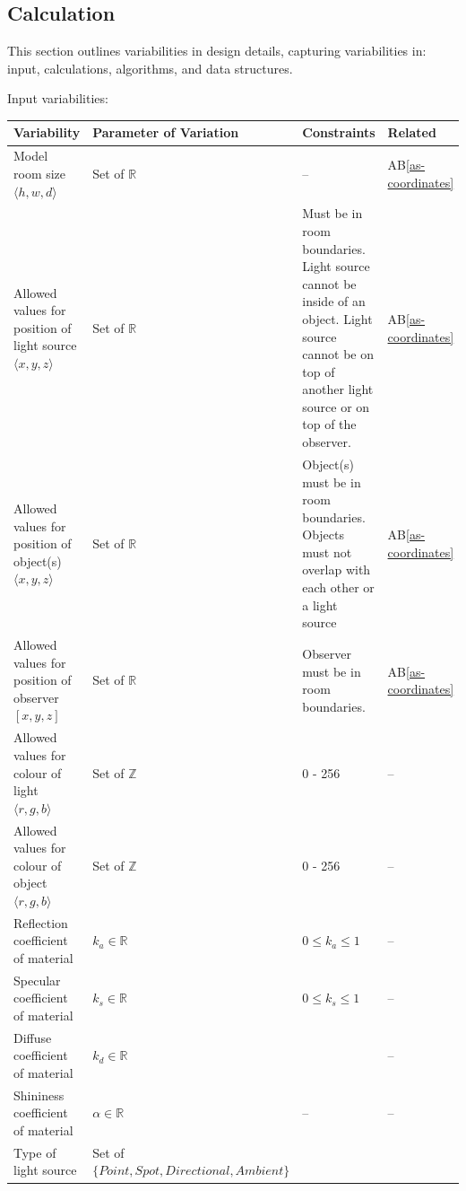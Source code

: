\documentclass[12pt]{article}
\newcommand{\aBref}[1]{AB\ref{#1}}
\begin{document}
\subsection{Calculation} \label{sec_Calculation}
This section outlines variabilities in design details, capturing variabilities 
in: input, calculations, algorithms, and data structures.

Input variabilities: 
\begin{table}[H]
	\centering
	\begin{tabular}{|p{5cm}|p{6cm}|p{4cm}|p{1cm}|}
		\hline
		\textbf{Variability} & \textbf{Parameter of Variation} & 
		\textbf{Constraints} &  \textbf{Related} \\
		\hline
		Model room size $\langle h,w,d \rangle$ & Set of $\mathbb{R}$ & -- & 
		\aBref{as-coordinates}\\
		\hline
		Allowed values for position of light source $\langle x,y,z \rangle$ & 
		Set of 
		$\mathbb{R}$ & Must be in room boundaries. Light source cannot be 
		inside of an object. Light source cannot be on top of another light 
		source or on top of the observer. & \aBref{as-coordinates}\\
		\hline
		Allowed values for position of object(s) $\langle x,y,z \rangle$ & Set 
		of $\mathbb{R}$ & Object(s) must be in room boundaries. Objects must 
		not overlap with each other or a light source & 
		\aBref{as-coordinates}\\
		\hline
		Allowed values for position of observer $[x,y,z]$ & Set of $\mathbb{R}$ 
		& Observer must be in room boundaries. & \aBref{as-coordinates}\\
		\hline				
		Allowed values for colour of light $\langle r,g,b \rangle$ & Set of 
		$\mathbb{Z}$ 
		& 0 - 256 & --\\
		\hline
		Allowed values for colour of object $\langle r,g,b \rangle$ & Set of 
		$\mathbb{Z}$ 
		& 0 - 256 & --\\
		\hline
		Reflection coefficient of material	& $k_{a} \in \mathbb{R}$ & $0 \le 
		k_{a} \le 1$ & -- \\
		\hline		
		Specular coefficient of material & $k_{s} \in \mathbb{R}$ & $0 \le 
		k_{s} \le 1$ & -- \\
		\hline
		Diffuse coefficient of material	& $k_{d} \in \mathbb{R}$ & & -- \\
		\hline
		Shininess coefficient of material	& $\alpha \in \mathbb{R}$ & -- & -- 
		\\
		\hline				
		Type of light source & Set of $\{Point, Spot, Directional, Ambient\}$ & 

\end{tabular}
\end{table}
\end{document}
